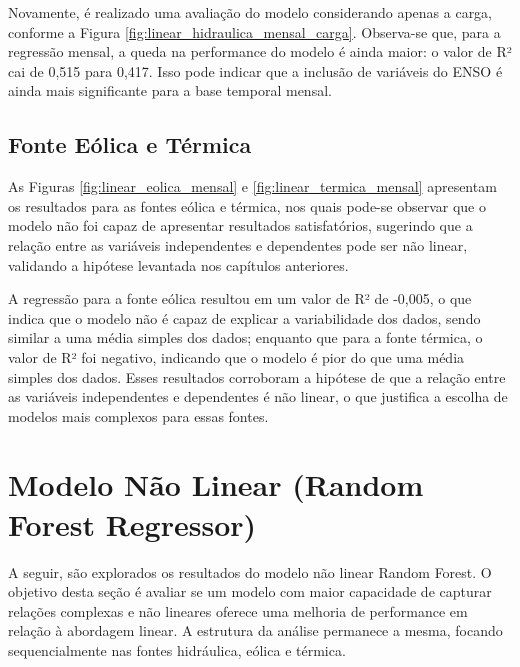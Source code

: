 Novamente, é realizado uma avaliação do modelo considerando apenas a carga, conforme a Figura 
\ref{fig:linear_hidraulica_mensal_carga}. Observa-se que, para a regressão mensal, a queda na performance do modelo é ainda
maior: o valor de R² cai de 0,515 para 0,417. Isso pode indicar que a inclusão de variáveis do ENSO é ainda mais significante 
para a base temporal mensal.

\subsection{Fonte Eólica e Térmica}
As Figuras \ref{fig:linear_eolica_mensal} e \ref{fig:linear_termica_mensal} apresentam os resultados para as fontes eólica 
e térmica, nos quais pode-se observar que o modelo não foi capaz de apresentar resultados satisfatórios, sugerindo
que a relação entre as variáveis independentes e dependentes pode ser não linear, validando a hipótese levantada nos capítulos
anteriores.

\begin{figure}[!ht]
  {}
  {}
\end{figure}
\begin{figure}[!ht]
  {}
  {}
\end{figure}

A regressão para a fonte eólica resultou em um valor de R² de -0,005, o que indica que o modelo não é capaz de explicar a 
variabilidade dos dados, sendo similar a uma média simples dos dados; enquanto que para a fonte térmica, o valor de R² foi negativo, 
indicando que o modelo é pior do que uma média simples dos dados. Esses resultados corroboram a hipótese de que a relação entre as 
variáveis independentes e dependentes é não linear, o que justifica a escolha de modelos mais complexos para essas fontes.


\section{Modelo Não Linear (Random Forest Regressor)}
A seguir, são explorados os resultados do modelo não linear Random Forest. O objetivo desta seção é avaliar se um modelo com maior 
capacidade de capturar relações complexas e não lineares oferece uma melhoria de performance em relação à abordagem linear. A estrutura 
da análise permanece a mesma, focando sequencialmente nas fontes hidráulica, eólica e térmica.
